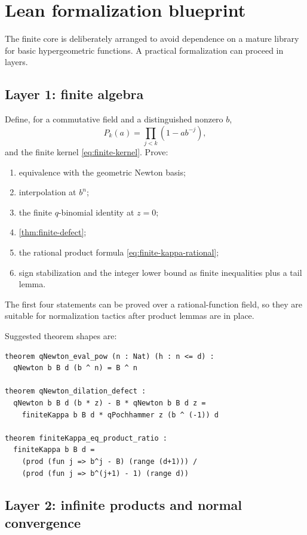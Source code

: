 \documentclass[11pt]{article}
\theoremstyle{definition}
\begin{document}
\section{Lean formalization blueprint}

The finite core is deliberately arranged to avoid dependence on a mature library for basic hypergeometric functions.  A practical formalization can proceed in layers.

\subsection{Layer 1: finite algebra}

Define, for a commutative field and a distinguished nonzero $b$,
\[
 P_k(a)=\prod_{j<k}(1-a b^{-j}),
\]
and the finite kernel \eqref{eq:finite-kernel}.  Prove:
\begin{enumerate}
  \item equivalence with the geometric Newton basis;
  \item interpolation at $b^n$;
  \item the finite $q$-binomial identity at $z=0$;
  \item \cref{thm:finite-defect};
  \item the rational product formula \eqref{eq:finite-kappa-rational};
  \item sign stabilization and the integer lower bound as finite inequalities plus a tail lemma.
\end{enumerate}
The first four statements can be proved over a rational-function field, so they are suitable for normalization tactics after product lemmas are in place.

Suggested theorem shapes are:
\begin{lstlisting}[style=code,language={},caption={Lean-oriented theorem signatures (schematic)}]
theorem qNewton_eval_pow (n : Nat) (h : n <= d) :
  qNewton b B d (b ^ n) = B ^ n

theorem qNewton_dilation_defect :
  qNewton b B d (b * z) - B * qNewton b B d z =
    finiteKappa b B d * qPochhammer z (b ^ (-1)) d

theorem finiteKappa_eq_product_ratio :
  finiteKappa b B d =
    (prod (fun j => b^j - B) (range (d+1))) /
    (prod (fun j => b^(j+1) - 1) (range d))
\end{lstlisting}

\subsection{Layer 2: infinite products and normal convergence}
\end{document}
